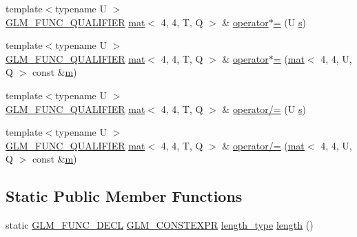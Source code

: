 \begin{DoxyCompactItemize}
\item 
{\footnotesize template$<$typename U $>$ }\\\hyperlink{setup_8hpp_a33fdea6f91c5f834105f7415e2a64407}{G\+L\+M\+\_\+\+F\+U\+N\+C\+\_\+\+Q\+U\+A\+L\+I\+F\+I\+ER} \hyperlink{structglm_1_1mat}{mat}$<$ 4, 4, T, Q $>$ \& \hyperlink{structglm_1_1mat_3_014_00_014_00_01_t_00_01_q_01_4_a9bf5d9e348d7f5ebc4945e96afe9e2f1}{operator$\ast$=} (U \hyperlink{_s_d_l__opengl_8h_a4af680a6c683f88ed67b76f207f2e6e4}{s})
\item 
{\footnotesize template$<$typename U $>$ }\\\hyperlink{setup_8hpp_a33fdea6f91c5f834105f7415e2a64407}{G\+L\+M\+\_\+\+F\+U\+N\+C\+\_\+\+Q\+U\+A\+L\+I\+F\+I\+ER} \hyperlink{structglm_1_1mat}{mat}$<$ 4, 4, T, Q $>$ \& \hyperlink{structglm_1_1mat_3_014_00_014_00_01_t_00_01_q_01_4_aa2dcaab7e49dd355e77e8dba78946669}{operator$\ast$=} (\hyperlink{structglm_1_1mat}{mat}$<$ 4, 4, U, Q $>$ const \&\hyperlink{_s_d_l__opengl__glext_8h_af593500c283bf1a787a6f947f503a5c2}{m})
\item 
{\footnotesize template$<$typename U $>$ }\\\hyperlink{setup_8hpp_a33fdea6f91c5f834105f7415e2a64407}{G\+L\+M\+\_\+\+F\+U\+N\+C\+\_\+\+Q\+U\+A\+L\+I\+F\+I\+ER} \hyperlink{structglm_1_1mat}{mat}$<$ 4, 4, T, Q $>$ \& \hyperlink{structglm_1_1mat_3_014_00_014_00_01_t_00_01_q_01_4_a21ed80672db29c6d29a43ec8e53ae869}{operator/=} (U \hyperlink{_s_d_l__opengl_8h_a4af680a6c683f88ed67b76f207f2e6e4}{s})
\item 
{\footnotesize template$<$typename U $>$ }\\\hyperlink{setup_8hpp_a33fdea6f91c5f834105f7415e2a64407}{G\+L\+M\+\_\+\+F\+U\+N\+C\+\_\+\+Q\+U\+A\+L\+I\+F\+I\+ER} \hyperlink{structglm_1_1mat}{mat}$<$ 4, 4, T, Q $>$ \& \hyperlink{structglm_1_1mat_3_014_00_014_00_01_t_00_01_q_01_4_a7d40629b14a68cedd7aca94bcb81c5d9}{operator/=} (\hyperlink{structglm_1_1mat}{mat}$<$ 4, 4, U, Q $>$ const \&\hyperlink{_s_d_l__opengl__glext_8h_af593500c283bf1a787a6f947f503a5c2}{m})
\end{DoxyCompactItemize}
\subsection*{Static Public Member Functions}
\begin{DoxyCompactItemize}
\item 
static \hyperlink{setup_8hpp_ab2d052de21a70539923e9bcbf6e83a51}{G\+L\+M\+\_\+\+F\+U\+N\+C\+\_\+\+D\+E\+CL} \hyperlink{setup_8hpp_a08b807947b47031d3a511f03f89645ad}{G\+L\+M\+\_\+\+C\+O\+N\+S\+T\+E\+X\+PR} \hyperlink{structglm_1_1mat_3_014_00_014_00_01_t_00_01_q_01_4_ae06c2957874bbff5701b304668b5cb01}{length\+\_\+type} \hyperlink{structglm_1_1mat_3_014_00_014_00_01_t_00_01_q_01_4_a345a0bcf281399c047cb15a6551232b0}{length} ()
\end{DoxyCompactItemize}
